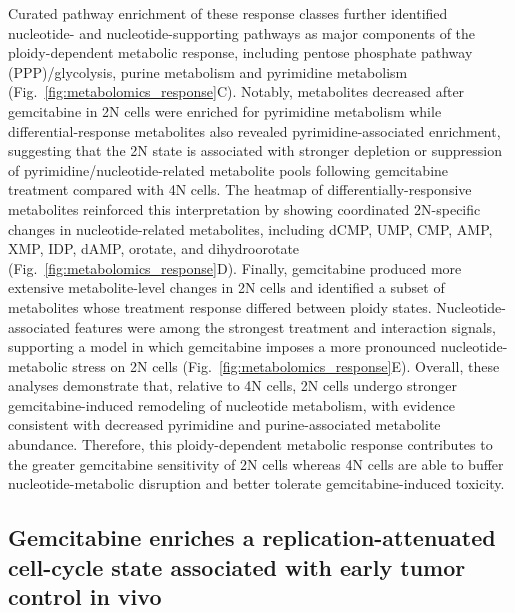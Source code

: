 \documentclass[11pt,notitlepage]{article}
\begin{document}
Curated pathway enrichment of these response classes further identified nucleotide- and nucleotide-supporting pathways as major components of the ploidy-dependent metabolic response, including pentose phosphate pathway (PPP)/glycolysis, purine metabolism and pyrimidine metabolism (Fig.~\ref{fig:metabolomics_response}C). Notably, metabolites decreased after gemcitabine in 2N cells were enriched for pyrimidine metabolism while differential-response metabolites also revealed pyrimidine-associated enrichment, suggesting that the 2N state is associated with stronger depletion or suppression of pyrimidine/nucleotide-related metabolite pools following gemcitabine treatment compared with 4N cells. The heatmap of differentially-responsive metabolites reinforced this interpretation by showing coordinated 2N-specific changes in nucleotide-related metabolites, including dCMP, UMP, CMP, AMP, XMP, IDP, dAMP, orotate, and dihydroorotate (Fig.~\ref{fig:metabolomics_response}D).
Finally, gemcitabine produced more extensive metabolite-level changes in 2N cells and identified a subset of metabolites whose treatment response differed between ploidy states. Nucleotide-associated features were among the strongest treatment and interaction signals, supporting a model in which gemcitabine imposes a more pronounced nucleotide-metabolic stress on 2N cells (Fig.~\ref{fig:metabolomics_response}E). Overall, these analyses demonstrate that, relative to 4N cells, 2N cells undergo stronger gemcitabine-induced remodeling of nucleotide metabolism, with evidence consistent with decreased pyrimidine and purine-associated metabolite abundance. Therefore, this ploidy-dependent metabolic response contributes to the greater gemcitabine sensitivity of 2N cells whereas 4N cells are able to buffer nucleotide-metabolic disruption and better tolerate gemcitabine-induced toxicity.



\subsection*{Gemcitabine enriches a replication-attenuated cell-cycle state associated with early tumor control in vivo}
\end{document}
